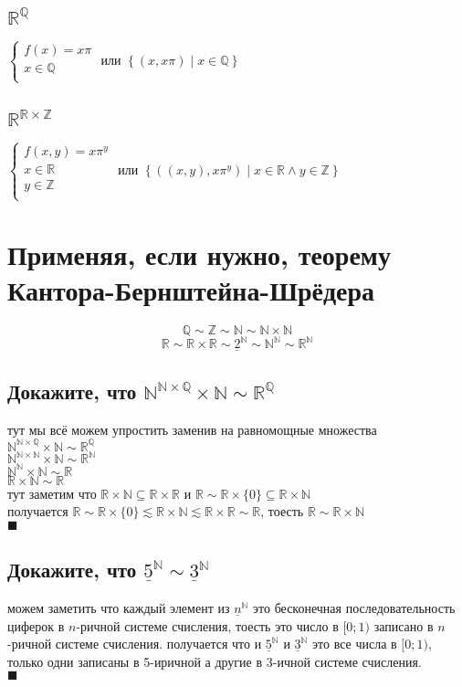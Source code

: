 \documentclass{article}
\newcommand{\ds}{\displaystyle}
\newcommand{\N}{\mathbb{N}}
\newcommand{\Z}{\mathbb{Z}}
\newcommand{\Q}{\mathbb{Q}}
\newcommand{\R}{\mathbb{R}}
\newcommand{\range}{\underline}
\renewcommand{\l}{\left}
\renewcommand{\r}{\right}
\begin{document}
  \subsection{$\R^{\Q}$}
  $\ds\begin{cases}
    f(x) = x\pi \\
    x \in \Q \\
  \end{cases}$ или $\ds \l\{(x,x\pi) \mid x \in \Q\r\}$
  \subsection{$\R^{\R\times\Z}$}
  $\ds\begin{cases}
    f(x,y) = x\pi^y \\
    x \in \R \\
    y \in \Z \\
  \end{cases}$ или $\ds \l\{((x,y),x\pi^y) \mid x \in \R \land y \in \Z \r\}$

  \section{Применяя, если нужно, теорему Кантора-Бернштейна-Шрёдера}
  $$ \Q \sim \Z \sim \N \sim \N\times\N $$
  $$ \R \sim \R\times\R \sim \range{2}^\N \sim \N^\N \sim \R^\N $$
  \subsection{Докажите, что $ \N^{\N\times\Q} \times \N \sim \R^\Q $}
  тут мы всё можем упростить заменив на равномощные множества \\
  $ \N^{\N\times\Q} \times \N \sim \R^\Q $ \\
  $ \N^{\N\times\N} \times \N \sim \R^\N $ \\
  $ \N^\N \times \N \sim \R $ \\
  $ \R\times\N \sim \R $ \\
  тут заметим что $ \R\times\N \subseteq \R\times\R $ и $ \R \sim \R\times\{0\} \subseteq \R\times\N $ \\
  получается $ \R \sim \R\times\{0\} \lesssim \R\times\N \lesssim \R\times\R \sim \R $, тоесть $ \R \sim \R\times\N $ \\
  $\blacksquare$

  \subsection{Докажите, что $ \range{5}^\N \sim \range{3}^\N $}
  можем заметить что каждый элемент из $ \range{n}^\N $ это бесконечная последовательность циферок в $n$-ричной системе счисления,
  тоесть это число в $[0;1)$ записано в $n$-ричной системе счисления.
  получается что и $ \range{5}^\N $ и $ \range{3}^\N $ это все числа в $[0;1)$,
  только одни записаны в 5-иричной а другие в 3-ичной системе счисления. \\
  $\blacksquare$
\end{document}
